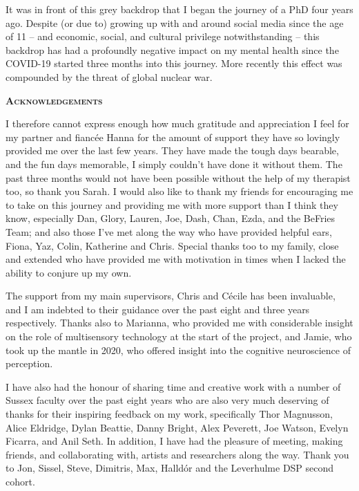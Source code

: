 It was in front of this grey backdrop that I began the journey of a PhD four years ago. Despite (or due to) growing up with and around social media since the age of 11 -- and economic, social, and cultural privilege notwithstanding -- this backdrop has had a profoundly negative impact on my mental health since the COVID-19 started three months into this journey. More recently this effect was compounded by the threat of global nuclear war.
\clearpage

{}
\begin{flushleft}
	\Huge \textsc{\textbf{Acknowledgements}}
	
\end{flushleft}

\noindent I therefore cannot express enough how much gratitude and appreciation I feel for my partner and fiancée Hanna for the amount of support they have so lovingly provided me over the last few years. They have made the tough days bearable, and the fun days memorable, I simply couldn't have done it without them. The past three months would not have been possible without the help of my therapist too, so thank you Sarah. I would also like to thank my friends for encouraging me to take on this journey and providing me with more support than I think they know, especially Dan, Glory, Lauren, Joe, Dash, Chan, Ezda, and the BeFries Team; and also those I've met along the way who have provided helpful ears, Fiona, Yaz, Colin, Katherine and Chris. Special thanks too to my family, close and extended who have provided me with motivation in times when I lacked the ability to conjure up my own.

The support from my main supervisors, Chris and C\'ecile has been invaluable, and I am indebted to their guidance over the past eight and three years respectively. Thanks also to Marianna, who provided me with considerable insight on the role of multisensory technology at the start of the project, and Jamie, who took up the mantle in 2020, who offered insight into the cognitive neuroscience of perception.

I have also had the honour of sharing time and creative work with a number of Sussex faculty over the past eight years who are also very much deserving of thanks for their inspiring feedback on my work, specifically Thor Magnusson, Alice Eldridge, Dylan Beattie, Danny Bright, Alex Peverett, Joe Watson, Evelyn Ficarra, and Anil Seth. In addition, I have had the pleasure of meeting, making friends, and collaborating with, artists and researchers along the way. Thank you to Jon, Sissel, Steve, Dimitris, Max, Halld\'or and the Leverhulme DSP second cohort.

